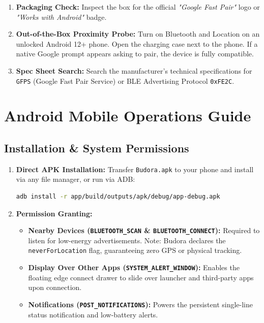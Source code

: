 \documentclass[11pt,a4paper]{article}
\begin{document}
\begin{tipbox}
\begin{enumerate}
    \item \textbf{Packaging Check:} Inspect the box for the official \textit{"Google Fast Pair"} logo or \textit{"Works with Android"} badge.
    \item \textbf{Out-of-the-Box Proximity Probe:} Turn on Bluetooth and Location on an unlocked Android 12+ phone. Open the charging case next to the phone. If a native Google prompt appears asking to pair, the device is fully compatible.
    \item \textbf{Spec Sheet Search:} Search the manufacturer's technical specifications for \texttt{GFPS} (Google Fast Pair Service) or BLE Advertising Protocol \texttt{0xFE2C}.
\end{enumerate}
\end{tipbox}

\section{Android Mobile Operations Guide}

\subsection{Installation \& System Permissions}
\begin{enumerate}
    \item \textbf{Direct APK Installation:} Transfer \texttt{Budora.apk} to your phone and install via any file manager, or run via ADB:
    \begin{lstlisting}[language=bash]
adb install -r app/build/outputs/apk/debug/app-debug.apk
    \end{lstlisting}
    \item \textbf{Permission Granting:}
    \begin{itemize}
        \item \textbf{Nearby Devices (\texttt{BLUETOOTH\_SCAN} \& \texttt{BLUETOOTH\_CONNECT}):} Required to listen for low-energy advertisements. Note: Budora declares the \texttt{neverForLocation} flag, guaranteeing zero GPS or physical tracking.
        \item \textbf{Display Over Other Apps (\texttt{SYSTEM\_ALERT\_WINDOW}):} Enables the floating edge connect drawer to slide over launcher and third-party apps upon connection.
        \item \textbf{Notifications (\texttt{POST\_NOTIFICATIONS}):} Powers the persistent single-line status notification and low-battery alerts.
    \end{itemize}
\end{enumerate}
\end{document}
